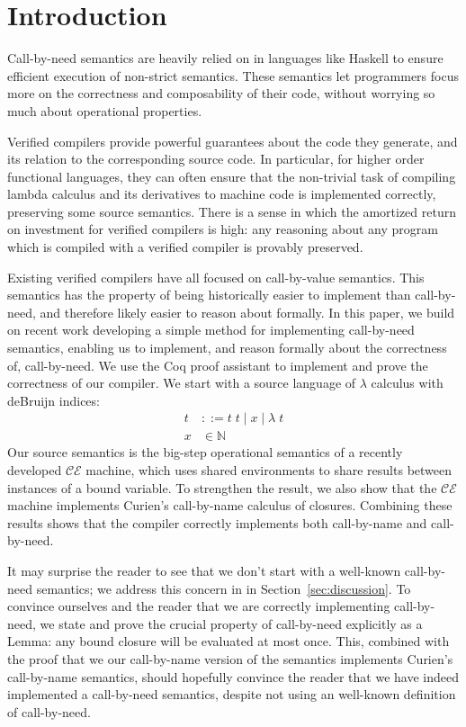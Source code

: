 \section{Introduction} \label{sec:introduction}
Call-by-need semantics are heavily relied on in languages like Haskell to ensure
efficient execution of non-strict semantics. These semantics let programmers
focus more on the correctness and composability of their code, without worrying
so much about operational properties. 

Verified compilers provide powerful guarantees about the code they generate, and
its relation to the corresponding source code. In particular, for higher order
functional languages, they can often ensure that the non-trivial task of
compiling lambda calculus and its derivatives to machine code is implemented
correctly, preserving some source semantics. There is a sense in which the
amortized return on investment for verified compilers is high: any reasoning
about any program which is compiled with a verified compiler is provably
preserved. 

Existing verified compilers have all focused on call-by-value semantics. This
semantics has the property of being historically easier to implement than
call-by-need, and therefore likely easier to reason about formally. In this
paper, we build on recent work developing a simple method for implementing
call-by-need semantics, enabling us to implement, and reason formally about the
correctness of, call-by-need. We use the Coq proof assistant \cite{coq} to
implement and prove the correctness of our compiler. We start with a source
language of $\lambda$ calculus with deBruijn indices:
\begin{align*}
 t &::= t \; t \; | \; x \; | \;  \lambda \; t \\
 x &\in \mathbb{N}
\end{align*}
Our source semantics is the big-step operational semantics of a recently
developed $\mathcal{CE}$ machine, which uses shared environments to share
results between instances of a bound variable. To strengthen the result, we also
show that the $\mathcal{CE}$ machine implements Curien's call-by-name calculus
of closures. Combining these results shows that the compiler correctly
implements both call-by-name and call-by-need.

It may surprise the reader to see that we don't start with a well-known
call-by-need semantics; we address this concern in in Section~\ref{sec:discussion}.
To convince ourselves and the reader that we are correctly implementing
call-by-need, we state and prove the crucial property of call-by-need explicitly
as a Lemma: any bound closure will be evaluated at most once. This, combined
with the proof that we our call-by-name version of the semantics implements
Curien's call-by-name semantics, should hopefully convince the reader that we
have indeed implemented a call-by-need semantics, despite not using an
well-known definition of call-by-need. 

